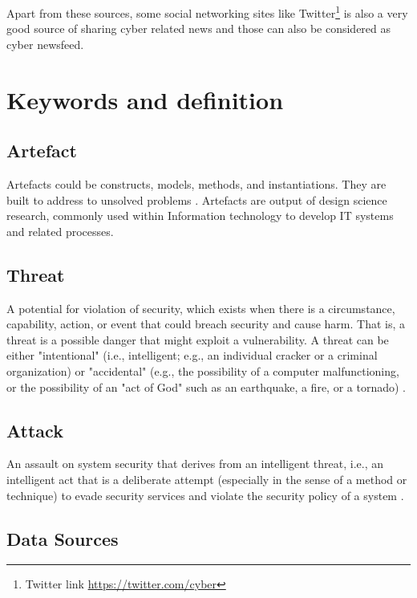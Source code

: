 Apart from these sources, 
some social networking sites like Twitter\footnote{Twitter link  \url{https://twitter.com/cyber}}
is also a very good source of sharing cyber related news 
and those can also be considered as cyber newsfeed.

\section{Keywords and definition}

\subsection{Artefact}	

Artefacts could be constructs, models, methods, 
and instantiations. 
They are built to address to unsolved problems 
\citep{march1995design}. 
Artefacts are output of design science research,
commonly used within Information technology to develop 
IT systems and related processes.

\subsection{Threat}	

A potential for violation of security, 
which exists when there is a circumstance, 
capability, action, or event 
that could breach security and cause harm.
That is, 
a threat is a possible danger that might exploit a vulnerability. 
A threat can be either "intentional" 
(i.e., intelligent; 
e.g., an individual cracker or a criminal organization) 
or "accidental" 
(e.g., the possibility of a computer malfunctioning, 
or the possibility of an "act of God" such as an earthquake, 
a fire, or a tornado) \citep[page 169]{RFC2828}.

\subsection{Attack}	

An assault on system security that derives from an intelligent threat, 
i.e., an intelligent act that is a deliberate attempt 
(especially in the sense of a method or technique) 
to evade security services and 
violate the security policy of a system 
\citep[page 13]{RFC2828}.

\subsection{Data Sources}	

